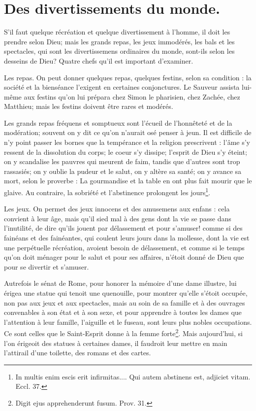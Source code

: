 \documentclass[instructions.tex]{subfiles}
\begin{document}
 
\chapter{Des divertissements du monde.}
 
S'il faut quelque récréation et quelque divertissement à l'homme, il doit les prendre selon Dieu; mais les grands repas, les jeux immodérés, les bals et les spectacles, qui sont les divertissemens ordinaires du monde, sont-ils selon les desseins de Dieu? Quatre chefs qu'il est important d'examiner.
 
\primo Les repas. On peut donner quelques repas, quelques festins, selon sa condition : la société et la bienséance l'exigent en certaines conjonctures. Le Sauveur assista lui-même aux festins qu'on lui prépara chez Simon le pharisien, chez Zachée, chez Matthieu; mais les festins doivent être rares et modérés.
 
Les grands repas fréquens et somptueux sont l'écueil de l'honnêteté et de la modération; souvent on y dit ce qu'on n'aurait osé penser à jeun. Il est difficile de n'y point passer les bornes que la tempérance et la religion prescrivent : l'âme s'y ressent de la dissolution du corps; le coeur s'y dissipe; l'esprit de Dieu s'y éteint; on y scandalise les pauvres qui meurent de faim, tandis que d'autres sont trop rassasiés; on y oublie la pudeur et le salut, on y altère sa santé; on y avance sa mort, selon le proverbe : La gourmandise et la table en ont plus fait mourir que le glaive. Au contraire, la sobriété et l'abstinence prolongent les jours\footnote{In multis enim escis erit infirmitas.... Qui autem abstinens est, adjiciet vitam. Eccl. 37.}.
 
\secundo Les jeux. On permet des jeux innocens et des amusemens aux enfans : cela convient à leur âge, mais qu'il sied mal à des gens dont la vie se passe dans l'inutilité, de dire qu'ils jouent par délassement et pour s'amuser! comme si des fainéans et des fainéantes, qui coulent leurs jours dans la mollesse, dont la vie est une perpétuelle récréation, avoient besoin de délassement, et comme si le temps qu'on doit ménager pour le salut et pour ses affaires, n'étoit donné de Dieu que pour se divertir et s'amuser.
 
Autrefois le sénat de Rome, pour honorer la mémoire d'une dame illustre, lui érigea une statue qui tenoit une quenouille, pour montrer qu'elle s'étoit occupée, non pas aux jeux et aux spectacles, mais au soin de sa famille et à des ouvrages convenables à son état et à son sexe, et pour apprendre à toutes les dames que l'attention à leur famille, l'aiguille et le fuseau, sont leurs plus nobles occupations. Ce sont celles que le Saint-Esprit donne à la femme forte\footnote{Digit ejus apprehenderunt fusum. Prov. 31.}. Mais aujourd'hui, si l'on érigeoit des statues à certaines dames, il faudroit leur mettre en main l'attirail d'une toilette, des romans et des cartes.
 
\end{document}
